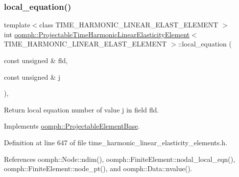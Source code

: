 \subsubsection{\texorpdfstring{local\+\_\+equation()}{local\_equation()}}
{\footnotesize\ttfamily template$<$class T\+I\+M\+E\+\_\+\+H\+A\+R\+M\+O\+N\+I\+C\+\_\+\+L\+I\+N\+E\+A\+R\+\_\+\+E\+L\+A\+S\+T\+\_\+\+E\+L\+E\+M\+E\+NT $>$ \\
int \hyperlink{classoomph_1_1ProjectableTimeHarmonicLinearElasticityElement}{oomph\+::\+Projectable\+Time\+Harmonic\+Linear\+Elasticity\+Element}$<$ T\+I\+M\+E\+\_\+\+H\+A\+R\+M\+O\+N\+I\+C\+\_\+\+L\+I\+N\+E\+A\+R\+\_\+\+E\+L\+A\+S\+T\+\_\+\+E\+L\+E\+M\+E\+NT $>$\+::local\+\_\+equation (\begin{DoxyParamCaption}\item[{const unsigned \&}]{fld,  }\item[{const unsigned \&}]{j }\end{DoxyParamCaption})\hspace{0.3cm}{\ttfamily [inline]}, {\ttfamily [virtual]}}



Return local equation number of value j in field fld. 



Implements \hyperlink{classoomph_1_1ProjectableElementBase_ac5c27ae929ff636dc7747fe23fd4f738}{oomph\+::\+Projectable\+Element\+Base}.



Definition at line 647 of file time\+\_\+harmonic\+\_\+linear\+\_\+elasticity\+\_\+elements.\+h.



References oomph\+::\+Node\+::ndim(), oomph\+::\+Finite\+Element\+::nodal\+\_\+local\+\_\+eqn(), oomph\+::\+Finite\+Element\+::node\+\_\+pt(), and oomph\+::\+Data\+::nvalue().

\mbox{\label{classoomph_1_1ProjectableTimeHarmonicLinearElasticityElement_a2c8f219649069bad135a0a1ca7bcd907}} 
